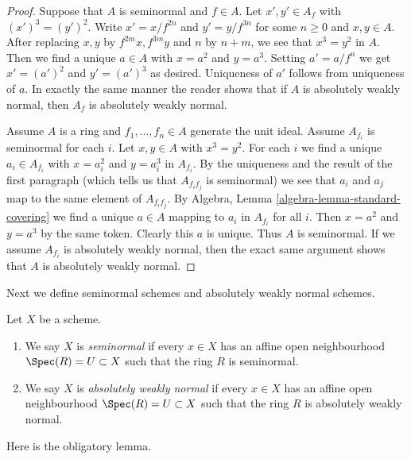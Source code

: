 \begin{proof}
Suppose that $A$ is seminormal and $f \in A$. Let $x', y' \in A_f$
with $(x')^3 = (y')^2$. Write $x' = x/f^{2n}$ and $y' = y/f^{3n}$
for some $n \geq 0$ and $x, y \in A$. After replacing $x, y$
by $f^{2m}x, f^{3m}y$ and $n$ by $n + m$, we see that
$x^3 = y^2$ in $A$. Then we find a unique $a \in A$ with
$x = a^2$ and $y = a^3$. Setting $a' = a/f^n$ we get
$x' = (a')^2$ and $y' = (a')^3$ as desired. Uniqueness
of $a'$ follows from uniqueness of $a$.
In exactly the same manner the reader shows that if $A$ is
absolutely weakly normal,
then $A_f$ is absolutely weakly normal.

\medskip\noindent
Assume $A$ is a ring and $f_1, \ldots, f_n \in A$ generate the unit
ideal. Assume $A_{f_i}$ is seminormal for each $i$.
Let $x, y \in A$ with $x^3 = y^2$. For each $i$ we find a unique
$a_i \in A_{f_i}$ with $x = a_i^2$ and $y = a_i^3$ in $A_{f_i}$.
By the uniqueness and the result of the first paragraph (which
tells us that $A_{f_if_j}$ is seminormal) we see that
$a_i$ and $a_j$ map to the same element of $A_{f_if_j}$.
By Algebra, Lemma \ref{algebra-lemma-standard-covering}
we find a unique $a \in A$
mapping to $a_i$ in $A_{f_i}$ for all $i$.
Then $x = a^2$ and $y = a^3$ by the same token. Clearly this $a$ is unique.
Thus $A$ is seminormal. If we assume $A_{f_i}$ is absolutely weakly normal,
then the exact same argument shows that $A$ is absolutely weakly normal.
\end{proof}

\noindent
Next we define seminormal schemes and absolutely weakly normal schemes.

\begin{definition}
\label{definition-seminormal}
Let $X$ be a scheme.
\begin{enumerate}
\item We say $X$ is {\it seminormal} if every $x \in X$ has
an affine open neighbourhood $\Spec(R) = U \subset X$
such that the ring $R$ is seminormal.
\item We say $X$ is {\it absolutely weakly normal} if every $x \in X$ has
an affine open neighbourhood $\Spec(R) = U \subset X$
such that the ring $R$ is absolutely weakly normal.
\end{enumerate}
\end{definition}

\noindent
Here is the obligatory lemma.

